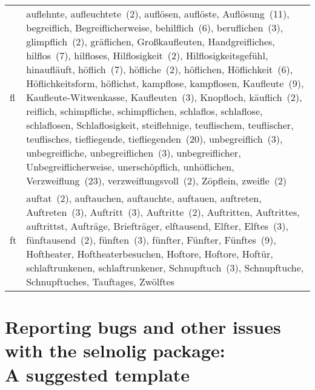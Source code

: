 \documentclass[11pt]{article}
\newcommand{\pkg}[1]{\textsf{#1}}
\begin{document}
\begin{tabularx}{\textwidth}{@{}lX@{}}
fl &
auflehnte,
aufleuchtete~(2),
auflösen,
auflöste,
Auflösung~(11),
begreiflich,
Begreiflicherweise,
behilflich~(6),
beruflichen~(3),
glimpflich~(2),
gräflichen,
Großkaufleuten,
Handgreifliches,
hilflos~(7),
hilfloses,
Hilf\-losigkeit~(2),
Hilflosigkeitsgefühl,
hinaufläuft,
höflich~(7),
höfliche~(2),
höflichen,
Höflichkeit~(6),
Höflichkeitsform,
höflichst,
kampflose,
kampflosen,
Kaufleute~(9),
Kaufleute-Witwenkasse,
Kauf\-leuten~(3),
Knopfloch,
käuflich~(2),
reiflich,
schimpfliche,
schimpflichen,
schlaflos,
schlaflose,
schlaflosen,
Schlaflosigkeit,
steiflehnige,
teuflischem,
teuflischer,
teuflisches,
tiefliegende,
tiefliegenden~(20),
unbegreif\-lich~(3),
unbegreifliche,
unbegreiflichen~(3),
unbegreiflicher,
Unbegreiflicherweise,
unerschöpflich,
unhöflichen,
Verzweiflung~(23),
verzweiflungsvoll~(2),
Zöpflein,
zweifle~(2)\\
ft &
auftat~(2),
auftauchen,
auftauchte,
auftauen,
auftreten,
Auftreten~(3),
Auftritt~(3),
Auftritte~(2),
Auftritten,
Auftrittes,
auftrittst,
Aufträge,
Briefträger,
elftausend,
Elfter,
Elftes~(3),
fünftausend~(2),
fünften~(3),
fünfter,
Fünfter,
Fünftes~(9),
Hoftheater,
Hoftheaterbesuchen,
Hoftore,
Hoftore,
Hoftür,
schlaftrunkenen,
schlaftrunkener,
Schnupftuch~(3),
Schnupftuche,
Schnupftuches,
Tauftages,
Zwölftes\\
\bottomrule
\end{tabularx}
\selnoligoff


\clearpage
\section[Reporting bugs and other issues with the selnolig package: A suggested template]{Reporting bugs and other issues with the \pkg{selnolig} package:\\A suggested template} \label{sec:template}

\end{document}
